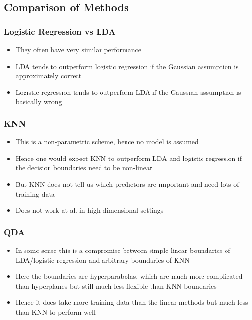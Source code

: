 \documentclass[../Main.tex]{subfiles}
\begin{document}
\subsection{Comparison of Methods}
\begin{multicols}{2}
    \subsubsection{Logistic Regression vs LDA}
    \begin{itemize}
        \item They often have very similar 
        performance 
        \item LDA tends to outperform logistic 
        regression if the Gaussian 
        assumption is approximately correct
        \item Logistic regression tends to 
        outperform LDA if the Gaussian 
        assumption is basically wrong
    \end{itemize}
    \subsubsection{KNN}
    \begin{itemize}
        \item  This is a non-parametric scheme, 
        hence no model is assumed
        \item Hence one would expect KNN to 
        outperform LDA and logistic 
        regression if the decision boundaries 
        need to be non-linear
        \item But KNN does not tell us which predictors 
        are important and need lots of training data
        \item Does not work at all in high dimensional 
        settings 
    \end{itemize}
    \subsubsection{QDA}
    \begin{itemize}
        \item In some sense this is a compromise 
        between simple linear boundaries of 
        LDA/logistic regression and arbitrary 
        boundaries of KNN
        \item Here the boundaries are 
        hyperparabolas, which are much 
        more complicated than hyperplanes 
        but still much less flexible than KNN 
        boundaries
        \item Hence it does take more training data 
        than the linear methods but much 
        less than KNN to perform well
    \end{itemize}
\end{multicols}
\end{document}
